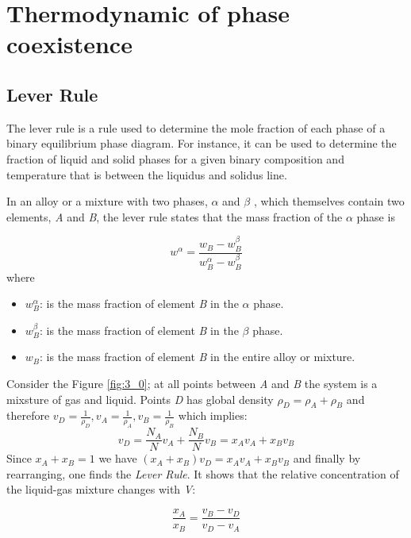 \documentclass[../main/main.tex]{subfiles}
\begin{document}
\section{Thermodynamic of phase coexistence}

\subsection{Lever Rule}


The lever rule \cite{3_lesson_1} is a rule used to determine the mole fraction of each phase of a binary equilibrium phase diagram. For instance, it can be used to determine the fraction of liquid and solid phases for a given binary composition and temperature that is between the liquidus and solidus line.

In an alloy or a mixture with two phases, \( \alpha  \)  and \( \beta  \) , which themselves contain two elements, \emph{A}  and \emph{B}, the lever rule states that the mass fraction of the \( \alpha  \)  phase is

\begin{equation}
w^{\alpha } = \frac{w_B - w_B^\beta }{w_B^\alpha - w_B^\beta }
\end{equation}
where
\begin{itemize}
\item \( w_B^\alpha  \):  is the mass fraction of element \emph{B}  in the \( \alpha  \) phase.
\item \( w_B^\beta   \):  is the mass fraction of element \emph{B} in the \( \beta  \)  phase.
\item \( w_B  \):  is the mass fraction of element \emph{B} in the entire alloy or mixture.
\end{itemize}

\begin{example}{}{}
  Consider the Figure \ref{fig:3_0}; at all points between \emph{A} and \emph{B} the system is a mixsture of gas and liquid. Points \emph{D} has global density \( \rho_D = \rho_A + \rho_B \)  and therefore \( v_D = \frac{1}{\rho_D}, v_A = \frac{1}{\rho _A}, v_B = \frac{1}{\rho_B} \) which implies:
  \begin{equation*}
    v_D = \frac{N_A}{N} v_A + \frac{N_B}{N} v_B = x_A v_A + x_B v_B
    \label{eq:}
  \end{equation*}
  Since \( x_A + x_B = 1 \) we have \( (x_A + x_B)v_D = x_A v_A + x_B v_B \) and finally by rearranging, one finds the \textit{Lever Rule}. It shows that the relative concentration of the liquid-gas mixture changes with \emph{V}:

  \begin{equation}
    \frac{x_A}{x_B} = \frac{v_B - v_D}{v_D - v_A}
    \label{eq:}
  \end{equation}
  
\end{example}
\end{document}

